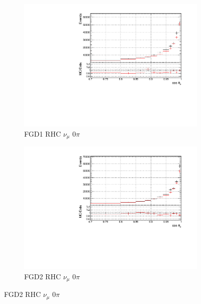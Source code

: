 \begin{figure}[!h]
\begin{subfigure}{0.49\textwidth}
  \centering
  \includegraphics[width=\textwidth]{figs/prioronly1D_t_FGD1_NuMuBkg_CC0pi_in_AntiNu_Mode}
  \caption{FGD1 RHC $\nu_{\mu}$ 0$\pi$}
\end{subfigure}
\begin{subfigure}{0.49\textwidth}
  \centering
  \includegraphics[width=\textwidth]{figs/prioronly1D_t_FGD2_NuMuBkg_CC0pi_in_AntiNu_Mode}
  \caption{FGD2 RHC $\nu_{\mu}$ 0$\pi$}
\end{subfigure}


\end{figure}
